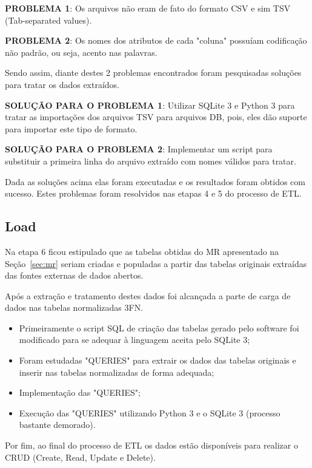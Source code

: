\documentclass[12pt]{article}
\begin{document}
	\textbf{PROBLEMA 1}: Os arquivos não eram de fato do formato CSV e sim TSV (Tab-separated values). 
	
	\textbf{PROBLEMA 2}: Os nomes dos atributos de cada "coluna" possuíam codificação não padrão, ou seja, acento nas palavras. 
	
	Sendo assim, diante destes 2 problemas encontrados foram pesquisadas soluções para tratar os dados extraídos.
	
	\textbf{SOLUÇÃO PARA O PROBLEMA 1}: Utilizar SQLite 3 e Python 3 para tratar as importações dos arquivos TSV para arquivos DB, pois, eles dão suporte para importar este tipo de formato.
	
	\textbf{SOLUÇÃO PARA O PROBLEMA 2}: Implementar um script para substituir a primeira linha do arquivo extraído com nomes válidos para tratar.
	
	Dada as soluções acima elas foram executadas e os resultados foram obtidos com sucesso. Estes problemas foram resolvidos nas etapas 4 e 5 do processo de ETL. 
	
	\subsection{Load}
	\label{sec:l}
	
	Na etapa 6 ficou estipulado que as tabelas obtidas do MR apresentado na Seção~\ref{sec:mr} seriam criadas e populadas a partir das tabelas originais extraídas das fontes externas de dados abertos.
	
	Após a extração e tratamento destes dados foi alcançada a parte de carga de dados nas tabelas normalizadas 3FN. 
	
	\begin{itemize}
		\item Primeiramente o script SQL de criação das tabelas gerado pelo software \cite{mysql} foi modificado para se adequar à linguagem aceita pelo SQLite 3;
		\item Foram estudadas "QUERIES" para extrair os dados das tabelas originais e inserir nas tabelas normalizadas de forma adequada;
		\item Implementação das "QUERIES";
		\item Execução das "QUERIES" utilizando Python 3 e o SQLite 3 (processo bastante demorado).
	\end{itemize}
	
	Por fim, ao final do processo de ETL os dados estão disponíveis para realizar o CRUD (Create, Read, Update e Delete).
	
\end{document}
